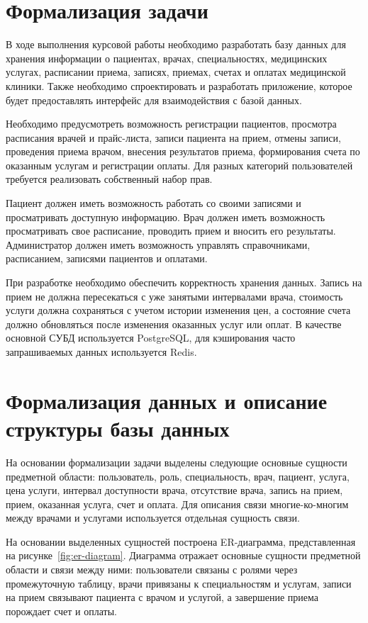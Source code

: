\section{Формализация задачи}

В ходе выполнения курсовой работы необходимо разработать базу данных для хранения информации о пациентах, врачах, специальностях, медицинских услугах, расписании приема, записях, приемах, счетах и оплатах медицинской клиники. Также необходимо спроектировать и разработать приложение, которое будет предоставлять интерфейс для взаимодействия с базой данных.

Необходимо предусмотреть возможность регистрации пациентов, просмотра расписания врачей и прайс-листа, записи пациента на прием, отмены записи, проведения приема врачом, внесения результатов приема, формирования счета по оказанным услугам и регистрации оплаты. Для разных категорий пользователей требуется реализовать собственный набор прав.

Пациент должен иметь возможность работать со своими записями и просматривать доступную информацию. Врач должен иметь возможность просматривать свое расписание, проводить прием и вносить его результаты. Администратор должен иметь возможность управлять справочниками, расписанием, записями пациентов и оплатами.

При разработке необходимо обеспечить корректность хранения данных. Запись на прием не должна пересекаться с уже занятыми интервалами врача, стоимость услуги должна сохраняться с учетом истории изменения цен, а состояние счета должно обновляться после изменения оказанных услуг или оплат. В качестве основной СУБД используется PostgreSQL, для кэширования часто запрашиваемых данных используется Redis.

\section{Формализация данных и описание структуры базы данных}

На основании формализации задачи выделены следующие основные сущности предметной области: пользователь, роль, специальность, врач, пациент, услуга, цена услуги, интервал доступности врача, отсутствие врача, запись на прием, прием, оказанная услуга, счет и оплата. Для описания связи многие-ко-многим между врачами и услугами используется отдельная сущность связи.

На основании выделенных сущностей построена ER-диаграмма, представленная на рисунке~\ref{fig:er-diagram}. Диаграмма отражает основные сущности предметной области и связи между ними: пользователи связаны с ролями через промежуточную таблицу, врачи привязаны к специальностям и услугам, записи на прием связывают пациента с врачом и услугой, а завершение приема порождает счет и оплаты.

